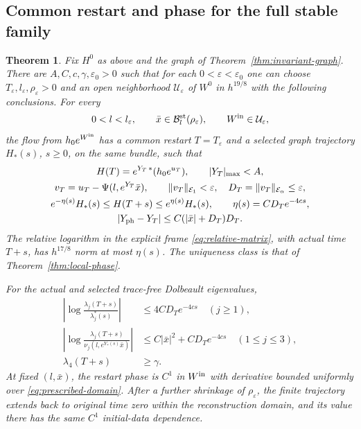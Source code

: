 \documentclass[11pt]{amsart}
\newtheorem{theorem}{Theorem}[section]
\theoremstyle{definition}
\theoremstyle{remark}
\begin{document}


\subsection{Common restart and phase for the full stable family}
\begin{theorem}\label{thm:prescribed-phase}
Fix $H^0$ as above and the graph of Theorem~\ref{thm:invariant-graph}.
There are $A,C,c,\gamma,\varepsilon_0>0$ such that for each
$0<\varepsilon<\varepsilon_0$ one can choose
$T_\varepsilon,l_\varepsilon,\rho_\varepsilon>0$ and an open
neighborhood $\mathcal U_\varepsilon$ of $W^0$ in $h^{19/8}$
with the following conclusions. For every
\begin{equation}\label{eq:prescribed-domain}
 0<l<l_\varepsilon,\qquad
 \bar x\in\mathcal B_l^{\rm st}(\rho_\varepsilon),\qquad
 W^{\rm in}\in\mathcal U_\varepsilon ,
\end{equation}
the flow from $h_0e^{W^{\rm in}}$ has a common restart
$T=T_\varepsilon$ and a selected graph trajectory $H_*(s)$,
$s\ge0$, on the same bundle, such that
\begin{equation}\label{eq:prescribed-tracking}
 \begin{gathered}
 H(T)=e^{Y_T\,*}(h_0e^{u_T}),\qquad |Y_T|_{\max}<A,\\
 v_T=u_T-\Psi(l,e^{Y_T}\bar x),\qquad
 \|v_T\|_{\mathcal E_1}<\varepsilon,\quad
 D_T=\|v_T\|_{\mathcal E_\alpha}\le\varepsilon,\\
 e^{-\eta(s)}H_*(s)\le H(T+s)\le e^{\eta(s)}H_*(s),
       \qquad\eta(s)=CD_Te^{-4cs},\\
 |Y_{\rm ph}-Y_T|\le C(|\bar x|+D_T)D_T .
 \end{gathered}
\end{equation}
The relative logarithm in the explicit frame
\eqref{eq:relative-matrix}, with actual time $T+s$, has
$h^{17/8}$ norm at most $\eta(s)$. The uniqueness class is that
of Theorem~\ref{thm:local-phase}.

For the actual and selected trace-free Dolbeault eigenvalues,
\begin{equation}\label{eq:prescribed-spectrum}
 \begin{aligned}
 \left|\log\frac{\lambda_j(T+s)}{\lambda_j^*(s)}\right|
       &\le4CD_Te^{-4cs}\quad(j\ge1),\\
 \left|\log\frac{\lambda_j(T+s)}
             {\nu_j(l,e^{Y_*(s)}\bar x)}\right|
       &\le C|\bar x|^2+CD_Te^{-4cs}\quad(1\le j\le3),\\
 \lambda_4(T+s)&\ge\gamma .
 \end{aligned}
\end{equation}
At fixed $(l,\bar x)$, the restart phase is $C^1$ in
$W^{\rm in}$ with derivative bounded uniformly over
\eqref{eq:prescribed-domain}. After a further shrinkage of
$\rho_\varepsilon$, the finite trajectory extends back to
original time zero within the reconstruction domain, and its
value there has the same $C^1$ initial-data dependence.
\end{theorem}
\end{document}
